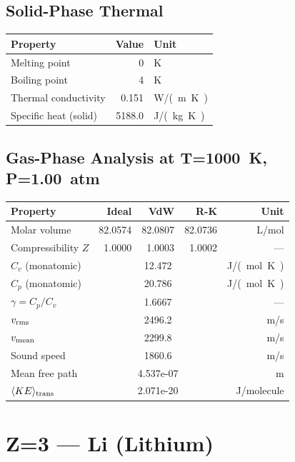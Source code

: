 \documentclass[11pt,a4paper]{article}
\begin{document}
\subsection{Solid-Phase Thermal}
\begin{tabular}{lrl}
  \toprule
  Property & Value & Unit \\
  \midrule
  Melting point & 0 & \si{K} \\
  Boiling point & 4 & \si{K} \\
  Thermal conductivity & 0.151 & \si{W/(m.K)} \\
  Specific heat (solid) & 5188.0 & \si{J/(kg.K)} \\
  \bottomrule
\end{tabular}

\subsection{Gas-Phase Analysis at T=\SI{1000}{K}, P=\SI{1.00}{atm}}
\begin{tabular}{lrrrr}
  \toprule
  Property & Ideal & VdW & R-K & Unit \\
  \midrule
  Molar volume & 82.0574 & 82.0807 & 82.0736 & \si{L/mol} \\
  Compressibility $Z$ & 1.0000 & 1.0003 & 1.0002 & --- \\
  \midrule
  $C_v$ (monatomic) & \multicolumn{3}{c}{12.472} & \si{J/(mol.K)} \\
  $C_p$ (monatomic) & \multicolumn{3}{c}{20.786} & \si{J/(mol.K)} \\
  $\gamma = C_p/C_v$ & \multicolumn{3}{c}{1.6667} & --- \\
  $v_{\rm rms}$ & \multicolumn{3}{c}{2496.2} & \si{m/s} \\
  $v_{\rm mean}$ & \multicolumn{3}{c}{2299.8} & \si{m/s} \\
  Sound speed & \multicolumn{3}{c}{1860.6} & \si{m/s} \\
  Mean free path & \multicolumn{3}{c}{4.537e-07} & \si{m} \\
  $\langle KE \rangle_{\rm trans}$ & \multicolumn{3}{c}{2.071e-20} & \si{J/molecule} \\
  \bottomrule
\end{tabular}

\newpage

\section{Z=3 --- Li (Lithium)}
\label{sec:Z3}
\end{document}
